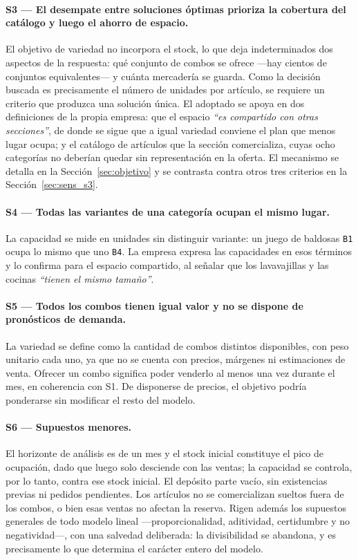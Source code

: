 \documentclass[10pt,a4paper]{article}
\newcommand{\art}[1]{\texttt{#1}}
\newcommand{\cita}[1]{\emph{``#1''}}
\begin{document}
\paragraph{S3 — El desempate entre soluciones óptimas prioriza la cobertura del
catálogo y luego el ahorro de espacio.} El objetivo de variedad no incorpora el
stock, lo que deja indeterminados dos aspectos de la respuesta: qué conjunto de
combos se ofrece —hay cientos de conjuntos equivalentes— y cuánta mercadería se
guarda. Como la decisión buscada es precisamente el número de unidades por
artículo, se requiere un criterio que produzca una solución única. El adoptado
se apoya en dos definiciones de la propia empresa: que el espacio
\cita{es compartido con otras secciones}, de donde se sigue que a igual variedad
conviene el plan que menos lugar ocupa; y el catálogo de artículos que la
sección comercializa, cuyas ocho categorías no deberían quedar sin
representación en la oferta. El mecanismo se detalla en la
Sección~\ref{sec:objetivo} y se contrasta contra otros tres criterios en la
Sección~\ref{sec:sens_s3}.

\paragraph{S4 — Todas las variantes de una categoría ocupan el mismo lugar.} La
capacidad se mide en unidades sin distinguir variante: un juego de baldosas
\art{B1} ocupa lo mismo que uno \art{B4}. La empresa expresa las capacidades en
esos términos y lo confirma para el espacio compartido, al señalar que los
lavavajillas y las cocinas \cita{tienen el mismo tamaño}.

\paragraph{S5 — Todos los combos tienen igual valor y no se dispone de
pronósticos de demanda.} La variedad se define como la cantidad de combos
distintos disponibles, con peso unitario cada uno, ya que no se cuenta con
precios, márgenes ni estimaciones de venta. Ofrecer un combo significa poder
venderlo al menos una vez durante el mes, en coherencia con S1. De disponerse de
precios, el objetivo podría ponderarse sin modificar el resto del modelo.

\paragraph{S6 — Supuestos menores.} El horizonte de análisis es de un mes y el
stock inicial constituye el pico de ocupación, dado que luego solo desciende con
las ventas; la capacidad se controla, por lo tanto, contra ese stock inicial. El
depósito parte vacío, sin existencias previas ni pedidos pendientes. Los
artículos no se comercializan sueltos fuera de los combos, o bien esas ventas no
afectan la reserva. Rigen además los supuestos generales de todo modelo lineal
—proporcionalidad, aditividad, certidumbre y no negatividad—, con una salvedad
deliberada: la divisibilidad se abandona, y es precisamente lo que determina el
carácter entero del modelo.
\end{document}
